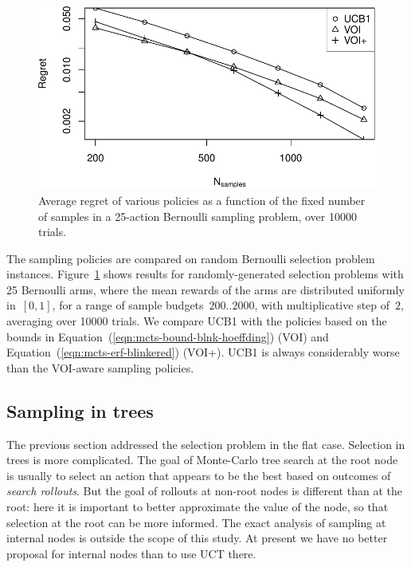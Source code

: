 \begin{figure}[h!]
\centering
\includegraphics[scale=0.55]{mcts-flat.pdf}
\caption{Average regret of various policies as a function of the fixed number 
of samples in a 25-action Bernoulli sampling problem, over 10000 trials.}
\label{fig:random-instances}
\end{figure}

The sampling policies are compared on random Bernoulli
selection problem instances. Figure~\ref{fig:random-instances} shows results for
randomly-generated selection problems with 25 Bernoulli arms, where
the mean rewards of the arms are distributed uniformly in~$[0,1]$, 
for a range of sample budgets~$200..2000$, with multiplicative
step of~$2$, averaging over 10000 trials.  We compare UCB1 with the 
policies based on the bounds in
Equation~(\ref{eqn:mcts-bound-blnk-hoeffding}) (VOI) and
Equation~(\ref{eqn:mcts-erf-blinkered}) (VOI+).
UCB1 is always considerably worse than the VOI-aware sampling policies.





\subsection{Sampling in trees}
\label{sec:mcts-empirical-evaluation}

The previous section addressed the selection problem in the flat case.
Selection in trees is more complicated.  The goal of Monte-Carlo tree 
search \cite{Chaslot.montecarlo} at the root node 
is usually to select an action that appears to be the best based on outcomes
of \textit{search rollouts}.
But the goal of rollouts at non-root nodes
is different than at the root: here it is important to better approximate the
value of the node, so that selection at the root can be more informed. The exact analysis
of sampling at internal nodes is outside the scope of this study. At present we 
have no better proposal for internal nodes than to use UCT there.

